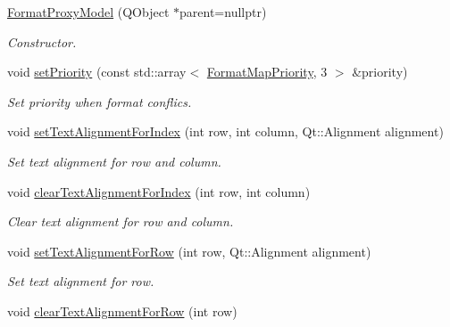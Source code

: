 \begin{DoxyCompactItemize}
\item 
\hyperlink{class_mdt_1_1_item_model_1_1_format_proxy_model_ab734e2b3a6b23f7ce5b7077cd330311a}{Format\+Proxy\+Model} (Q\+Object $\ast$parent=nullptr)\hypertarget{class_mdt_1_1_item_model_1_1_format_proxy_model_ab734e2b3a6b23f7ce5b7077cd330311a}{}\label{class_mdt_1_1_item_model_1_1_format_proxy_model_ab734e2b3a6b23f7ce5b7077cd330311a}

\begin{DoxyCompactList}\small\item\em Constructor. \end{DoxyCompactList}\item 
void \hyperlink{class_mdt_1_1_item_model_1_1_format_proxy_model_a3841a73b1908f3ab9260c14b0cdc607d}{set\+Priority} (const std\+::array$<$ \hyperlink{namespace_mdt_1_1_item_model_a4f59200e524d67369e535854e7d8f12b}{Format\+Map\+Priority}, 3 $>$ \&priority)
\begin{DoxyCompactList}\small\item\em Set priority when format conflics. \end{DoxyCompactList}\item 
void \hyperlink{class_mdt_1_1_item_model_1_1_format_proxy_model_af9b6d3193bdb0f96a8e748120c3486e6}{set\+Text\+Alignment\+For\+Index} (int row, int column, Qt\+::\+Alignment alignment)
\begin{DoxyCompactList}\small\item\em Set text alignment for row and column. \end{DoxyCompactList}\item 
void \hyperlink{class_mdt_1_1_item_model_1_1_format_proxy_model_a3a7bef0411dee89b27c8b6accec29c9e}{clear\+Text\+Alignment\+For\+Index} (int row, int column)
\begin{DoxyCompactList}\small\item\em Clear text alignment for row and column. \end{DoxyCompactList}\item 
void \hyperlink{class_mdt_1_1_item_model_1_1_format_proxy_model_ac195e4e759f39c7f247aa94cd2c497c2}{set\+Text\+Alignment\+For\+Row} (int row, Qt\+::\+Alignment alignment)
\begin{DoxyCompactList}\small\item\em Set text alignment for row. \end{DoxyCompactList}\item 
void \hyperlink{class_mdt_1_1_item_model_1_1_format_proxy_model_ac5eb2990a303d92a129cc6736de8e9a5}{clear\+Text\+Alignment\+For\+Row} (int row)

\end{DoxyCompactItemize}
